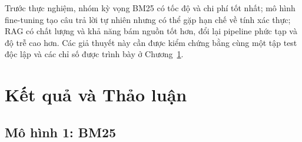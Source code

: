 \documentclass[12pt,a4paper,oneside]{report}
\begin{document}
Trước thực nghiệm, nhóm kỳ vọng BM25 có tốc độ và chi phí tốt nhất; mô hình fine-tuning tạo câu trả lời tự nhiên nhưng có thể gặp hạn chế về tính xác thực; RAG có chất lượng và khả năng bám nguồn tốt hơn, đổi lại pipeline phức tạp và độ trễ cao hơn. Các giả thuyết này cần được kiểm chứng bằng cùng một tập test độc lập và các chỉ số được trình bày ở Chương~\ref{chap:results}.

\chapter{Kết quả và Thảo luận}
\label{chap:results}

\section{Mô hình 1: BM25}
\end{document}
